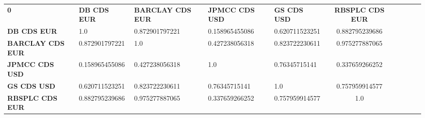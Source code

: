 \begin{center}
 \begin{tabular}{|l|l|l|l|l|c|c|c|c|c|}
\hline
\textbf{0} & \textbf{DB CDS EUR} & \textbf{BARCLAY CDS EUR} & \textbf{JPMCC CDS USD} & \textbf{GS CDS USD} & \textbf{RBSPLC CDS EUR}\\\hhline{|=|=|=|=|=|=|}
\textbf{DB CDS EUR} & 1.0 & 0.872901797221 & 0.158965455086 & 0.620711523251 & 0.882795239686\\
\textbf{BARCLAY CDS EUR} & 0.872901797221 & 1.0 & 0.427238056318 & 0.823722230611 & 0.975277887065\\
\textbf{JPMCC CDS USD} & 0.158965455086 & 0.427238056318 & 1.0 & 0.76345715141 & 0.337659266252\\
\textbf{GS CDS USD} & 0.620711523251 & 0.823722230611 & 0.76345715141 & 1.0 & 0.757959914577\\
\textbf{RBSPLC CDS EUR} & 0.882795239686 & 0.975277887065 & 0.337659266252 & 0.757959914577 & 1.0\\
\hline
\end{tabular}
\end{center}